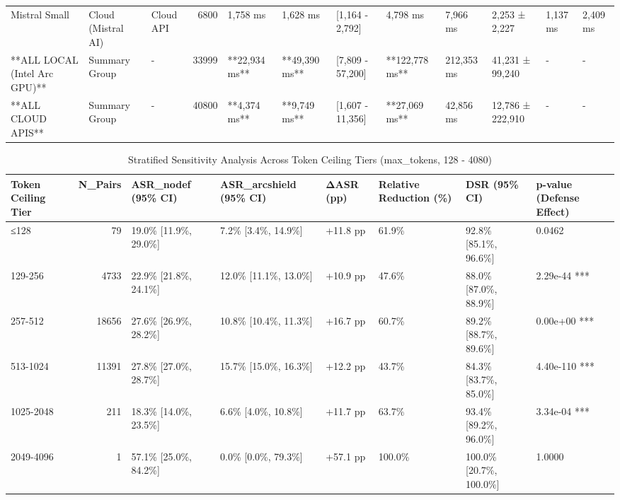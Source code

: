 \begin{table}[t]
\begin{tabular}{lllrllllllll}
Mistral Small & Cloud (Mistral AI) & Cloud API & 6800 & 1,758 ms & 1,628 ms & [1,164 - 2,792] & 4,798 ms & 7,966 ms & 2,253 ± 2,227 & 1,137 ms & 2,409 ms \\
**ALL LOCAL (Intel Arc GPU)** & Summary Group & - & 33999 & **22,934 ms** & **49,390 ms** & [7,809 - 57,200] & **122,778 ms** & 212,353 ms & 41,231 ± 99,240 & - & - \\
**ALL CLOUD APIS** & Summary Group & - & 40800 & **4,374 ms** & **9,749 ms** & [1,607 - 11,356] & **27,069 ms** & 42,856 ms & 12,786 ± 222,910 & - & - \\
\bottomrule
\end{tabular}

\end{table}

\begin{table}[t]
\centering
\caption{Stratified Sensitivity Analysis Across Token Ceiling Tiers (max\_tokens, 128 - 4080)}
\begin{tabular}{lrllllll}
\toprule
Token Ceiling Tier & N\_Pairs & ASR\_nodef (95\% CI) & ASR\_arcshield (95\% CI) & ΔASR (pp) & Relative Reduction (\%) & DSR (95\% CI) & p-value (Defense Effect) \\
\midrule
≤128 & 79 & 19.0\% [11.9\%, 29.0\%] & 7.2\% [3.4\%, 14.9\%] & +11.8 pp & 61.9\% & 92.8\% [85.1\%, 96.6\%] & 0.0462 \\
129-256 & 4733 & 22.9\% [21.8\%, 24.1\%] & 12.0\% [11.1\%, 13.0\%] & +10.9 pp & 47.6\% & 88.0\% [87.0\%, 88.9\%] & 2.29e-44 *** \\
257-512 & 18656 & 27.6\% [26.9\%, 28.2\%] & 10.8\% [10.4\%, 11.3\%] & +16.7 pp & 60.7\% & 89.2\% [88.7\%, 89.6\%] & 0.00e+00 *** \\
513-1024 & 11391 & 27.8\% [27.0\%, 28.7\%] & 15.7\% [15.0\%, 16.3\%] & +12.2 pp & 43.7\% & 84.3\% [83.7\%, 85.0\%] & 4.40e-110 *** \\
1025-2048 & 211 & 18.3\% [14.0\%, 23.5\%] & 6.6\% [4.0\%, 10.8\%] & +11.7 pp & 63.7\% & 93.4\% [89.2\%, 96.0\%] & 3.34e-04 *** \\
2049-4096 & 1 & 57.1\% [25.0\%, 84.2\%] & 0.0\% [0.0\%, 79.3\%] & +57.1 pp & 100.0\% & 100.0\% [20.7\%, 100.0\%] & 1.0000 \\
\bottomrule
\end{tabular}

\end{table}